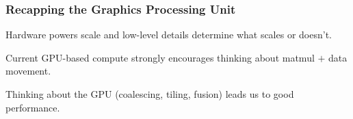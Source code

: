\documentclass[12pt,twoside]{article}
\begin{document}
\subsubsection*{Recapping the Graphics Processing Unit}

\begin{center}
    Hardware powers scale and low-level details determine what scales or doesn't.
\end{center}

\begin{center}
    Current GPU-based compute strongly encourages thinking about matmul \(+\) data movement.
\end{center}

\begin{center}
    Thinking about the GPU (coalescing, tiling, fusion) leads us to good performance. 
\end{center}
\end{document}
